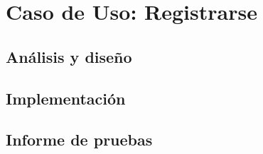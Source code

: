 \section{Caso de Uso: Registrarse}

\subsection*{Análisis y diseño}

\subsection*{Implementación}

\subsection*{Informe de pruebas}
